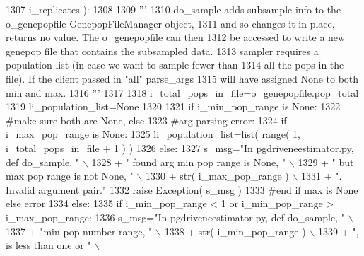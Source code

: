 \begin{DoxyCode}
1307                 i\_replicates ):
1308 
1309     \textcolor{stringliteral}{'''}
1310 \textcolor{stringliteral}{    do\_sample adds subsample info to the o\_genepopfile GenepopFileManager object,}
1311 \textcolor{stringliteral}{    and so changes it in place, returns no value.  The o\_genepopfile can then}
1312 \textcolor{stringliteral}{    be accessed to write a new genepop file that contains the subsampled data.}
1313 \textcolor{stringliteral}{    sampler requires a population list (in case we want to sample fewer than}
1314 \textcolor{stringliteral}{    all the pops in the file). If the client passed in "all" parse\_args}
1315 \textcolor{stringliteral}{    will have assigned None to both min and max.}
1316 \textcolor{stringliteral}{    '''}
1317 
1318     i\_total\_pops\_in\_file=o\_genepopfile.pop\_total
1319     li\_population\_list=\textcolor{keywordtype}{None}
1320 
1321     \textcolor{keywordflow}{if} i\_min\_pop\_range \textcolor{keywordflow}{is} \textcolor{keywordtype}{None}:
1322         \textcolor{comment}{#make sure both are None, else}
1323         \textcolor{comment}{#arg-parsing error:}
1324         \textcolor{keywordflow}{if} i\_max\_pop\_range \textcolor{keywordflow}{is} \textcolor{keywordtype}{None}:
1325             li\_population\_list=list( range( 1, i\_total\_pops\_in\_file + 1 ) )
1326         \textcolor{keywordflow}{else}:
1327             s\_msg=\textcolor{stringliteral}{"In pgdriveneestimator.py, def do\_sample, "} \(\backslash\)
1328                         + \textcolor{stringliteral}{" found arg min pop range is None, "} \(\backslash\)
1329                         + \textcolor{stringliteral}{" but max pop range is not None, "} \(\backslash\)
1330                         + str( i\_max\_pop\_range ) \(\backslash\)
1331                         + \textcolor{stringliteral}{".  Invalid argument pair."}
1332             \textcolor{keywordflow}{raise} Exception( s\_msg )
1333         \textcolor{comment}{#end if max is None else error}
1334     \textcolor{keywordflow}{else}:
1335         \textcolor{keywordflow}{if} i\_min\_pop\_range < 1 \textcolor{keywordflow}{or} i\_min\_pop\_range > i\_max\_pop\_range:
1336             s\_msg=\textcolor{stringliteral}{"In pgdriveneestimator.py, def do\_sample, "} \(\backslash\)
1337                         + \textcolor{stringliteral}{"min pop number range, "} \(\backslash\)
1338                         + str( i\_min\_pop\_range ) \(\backslash\)
1339                         + \textcolor{stringliteral}{", is less than one or "} \(\backslash\)

\end{DoxyCode}
